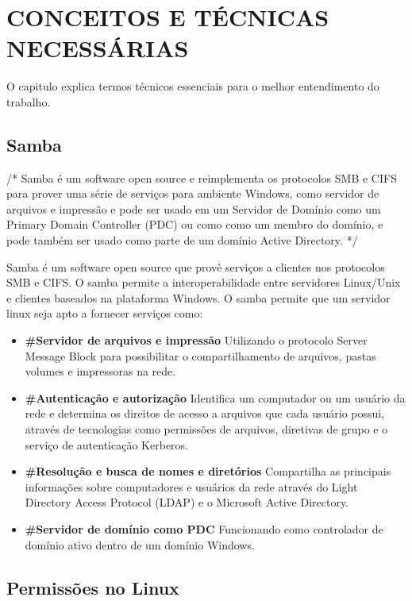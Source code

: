 \chapter{CONCEITOS E TÉCNICAS NECESSÁRIAS}

O capitulo explica termos técnicos essenciais para o melhor entendimento do trabalho.

\section{Samba}

/* Samba é um software open source e reimplementa os protocolos SMB e CIFS para prover
uma série de serviços para ambiente Windows, como servidor de arquivos e impressão e pode
ser usado em um Servidor de Domínio como um Primary Domain Controller (PDC) ou como
como um membro do domínio, e pode também ser usado como parte de um domínio Active
Directory. */

Samba é um software open source que provê serviços a clientes nos protocolos SMB e CIFS.
O samba permite a interoperabilidade entre servidores Linux/Unix e clientes baseados na
plataforma Windows.
O samba permite que um servidor linux seja apto a fornecer serviços como:
  \begin{itemize}
    \item \textbf{\#Servidor de arquivos e impressão} Utilizando o protocolo Server Message Block para possibilitar o compartilhamento de arquivos, pastas volumes e impressoras na rede.

    \item \textbf{\#Autenticação e autorização} Identifica um computador ou um usuário da rede e determina os direitos de acesso a arquivos que cada usuário possui, através de tecnologias como permissões de arquivos, diretivas de grupo e o serviço de autenticação Kerberos.

    \item \textbf{\#Resolução e busca de nomes e diretórios} Compartilha as principais informações sobre computadores e usuários da rede através do Light Directory Access Protocol (LDAP) e o Microsoft Active Directory.

    \item \textbf{\#Servidor de domínio como PDC} Funcionando como controlador de domínio ativo dentro de um domínio Windows.
  \end{itemize}

\section{Permissões no Linux}

